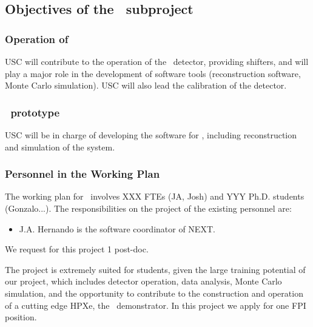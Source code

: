 \subsection{Objectives of the \sUSC\ subproject}
\label{sec.obj.dipc}
\subsubsection*{Operation of \Next}

\indent

USC will contribute to the operation of the \Next\ detector, providing shifters, and will play a major role in the development of software tools (reconstruction software, Monte Carlo simulation). USC will also lead the calibration of the detector. 


\subsubsection*{\HDEMO\ prototype}

\indent

USC will be in charge of developing the software for \HDEMO, including reconstruction and simulation of the system. 
 



\subsubsection*{Personnel in the Working Plan}
The working plan for \sIFIC\ involves XXX FTEs (JA, Josh) and YYY Ph.D. students (Gonzalo...). The responsibilities on the project of the existing personnel are:


\begin{itemize}[noitemsep,topsep=0pt,parsep=0pt,partopsep=0pt]
\item J.A. Hernando is the software coordinator of NEXT.  
\end{itemize}

We request for this project 1 post-doc. 

The project is extremely suited for students, given the large training potential of our project, which includes detector operation, data analysis, Monte Carlo simulation, and the opportunity to contribute to the construction and operation of a cutting edge HPXe, the \HDEMO\ demonstrator. In this project we apply for one FPI position. 

